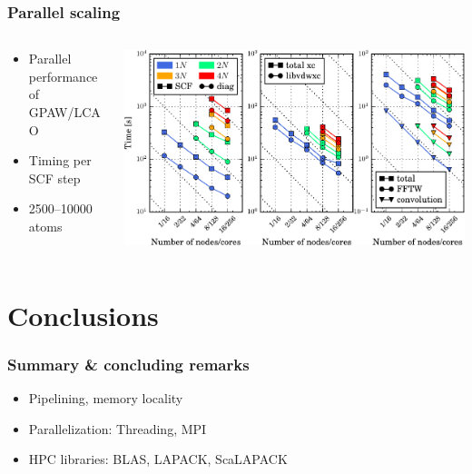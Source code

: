 \documentclass[usenames,dvipsnames,mathserif,compress]{beamer}
\begin{document}
\begin{frame}
  \frametitle{Parallel scaling}
  \begin{columns}
    \begin{column}{0.67\textwidth}
      \begin{itemize}
      \item Parallel performance of GPAW/LCAO
      \item Timing per SCF step
      \item 2500--10000 atoms
      \end{itemize}
    \end{column}
    \begin{column}{.4\textwidth}
      \includegraphics[scale=0.85]{lcao-scaling-crop.pdf}
    \end{column}
  \end{columns}
\end{frame}

\section*{Conclusions}
\begin{frame}
  \frametitle{Summary \& concluding remarks}
  \begin{itemize}
  \item Pipelining, memory locality
  \item Parallelization: Threading, MPI
  \item HPC libraries: BLAS, LAPACK, ScaLAPACK
  \end{itemize}
\end{frame}










\end{document}

